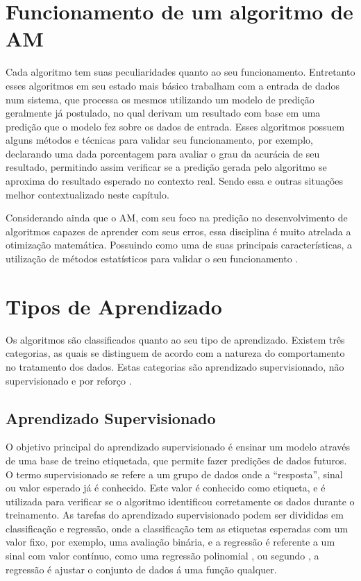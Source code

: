 \section{Funcionamento de um algoritmo de AM}
Cada algoritmo tem suas peculiaridades quanto ao seu funcionamento. Entretanto esses algoritmos em seu estado mais básico trabalham com a entrada de dados num sistema, que processa os mesmos utilizando um modelo de predição geralmente já postulado, no qual derivam um resultado com base em uma predição que o modelo fez sobre os dados de entrada. Esses algoritmos possuem alguns métodos e técnicas para validar seu funcionamento, por exemplo, declarando uma dada porcentagem para avaliar o grau da acurácia de seu resultado, permitindo assim verificar se a predição gerada pelo algoritmo se aproxima do resultado esperado no contexto real. Sendo essa e outras situações melhor contextualizado neste capítulo.

Considerando ainda que o AM, com seu foco na predição no desenvolvimento de algoritmos capazes de aprender com seus erros, essa disciplina é muito atrelada a otimização matemática. Possuindo como uma de suas principais características, a utilização de métodos estatísticos para validar o seu funcionamento \cite{trevor2009elements}.

\section{Tipos de Aprendizado}
Os algoritmos são classificados quanto ao seu tipo de aprendizado. Existem três categorias, as quais se distinguem de acordo com a natureza do comportamento no tratamento dos dados. Estas categorias são aprendizado supervisionado, não supervisionado e por reforço \cite{geron2017hands}.
 
\subsection{Aprendizado Supervisionado}
O objetivo principal do aprendizado supervisionado é ensinar um modelo através de uma base de treino etiquetada, que permite fazer predições de dados futuros. O termo supervisionado se refere a um grupo de dados onde a “resposta”, sinal ou valor esperado já é conhecido. Este valor é conhecido como etiqueta, e é utilizada para verificar se o algoritmo identificou corretamente os dados durante o treinamento. As tarefas do aprendizado supervisionado podem ser divididas em classificação e regressão, onde a classificação tem as etiquetas esperadas com um valor fixo, por exemplo, uma avaliação binária, e a regressão é referente a um sinal com valor contínuo, como uma regressão polinomial \cite{geron2017hands}, ou segundo \cite{kirk2014thoughtful}, a regressão é ajustar o conjunto de dados á uma função qualquer.

